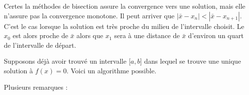 \begin{normaltext}
    Certes la méthodes de bisection assure la convergence vers une solution, mais elle n'assure pas la convergence monotone. Il peut arriver que \( | \bar x-x_n |<| \bar x-x_{n+1} |\). C'est le cas lorsque la solution est très proche du milieu de l'intervalle choisit. Le \( x_0\) est alors proche de \( \bar x\) alors que \( x_1\) sera à une distance de \( \bar x\) d'environ un quart de l'intervalle de départ.
\end{normaltext}

Supposons déjà avoir trouvé un intervalle \( \mathopen[ a , b \mathclose]\) dans lequel se trouve une unique solution à \( f(x)=0\). Voici un algorithme possible.



Plusieurs remarques :
